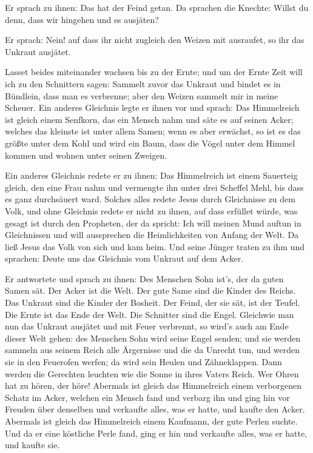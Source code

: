  Er sprach zu ihnen: Das hat der Feind getan. Da sprachen
die Knechte: Willst du denn, dass wir hingehen und es ausjäten?

 Er sprach: Nein! auf dass ihr nicht zugleich den Weizen
mit ausraufet, so ihr das Unkraut ausjätet.

 Lasset beides miteinander wachsen bis zu der Ernte; und
um der Ernte Zeit will ich zu den Schnittern sagen: Sammelt zuvor das
Unkraut und bindet es in Bündlein, dass man es verbrenne; aber den
Weizen sammelt mir in meine Scheuer.  Ein anderes
Gleichnis legte er ihnen vor und sprach: Das Himmelreich ist gleich
einem Senfkorn, das ein Mensch nahm und säte es auf seinen Acker;
 welches das kleinste ist unter allem Samen; wenn es aber
erwächst, so ist es das größte unter dem Kohl und wird ein Baum, dass
die Vögel unter dem Himmel kommen und wohnen unter seinen Zweigen.

 Ein anderes Gleichnis redete er zu ihnen: Das
Himmelreich ist einem Sauerteig gleich, den eine Frau nahm und vermengte
ihn unter drei Scheffel Mehl, bis dass es ganz durchsäuert ward.
 Solches alles redete Jesus durch Gleichnisse zu dem
Volk, und ohne Gleichnis redete er nicht zu ihnen,  auf
dass erfüllet würde, was gesagt ist durch den Propheten, der da spricht:
Ich will meinen Mund auftun in Gleichnissen und will aussprechen die
Heimlichkeiten von Anfang der Welt.  Da ließ Jesus das
Volk von sich und kam heim. Und seine Jünger traten zu ihm und sprachen:
Deute uns das Gleichnis vom Unkraut auf dem Acker.

 Er antwortete und sprach zu ihnen: Des Menschen Sohn
ist's, der da guten Samen sät.  Der Acker ist die Welt.
Der gute Same sind die Kinder des Reichs. Das Unkraut sind die Kinder
der Bosheit.  Der Feind, der sie sät, ist der Teufel. Die
Ernte ist das Ende der Welt. Die Schnitter sind die Engel.
 Gleichwie man nun das Unkraut ausjätet und mit Feuer
verbrennt, so wird's auch am Ende dieser Welt gehen:  des
Menschen Sohn wird seine Engel senden; und sie werden sammeln aus seinem
Reich alle Ärgernisse und die da Unrecht tun,  und werden
sie in den Feuerofen werfen; da wird sein Heulen und Zähneklappen.
 Dann werden die Gerechten leuchten wie die Sonne in
ihres Vaters Reich. Wer Ohren hat zu hören, der höre! 
Abermals ist gleich das Himmelreich einem verborgenen Schatz im Acker,
welchen ein Mensch fand und verbarg ihn und ging hin vor Freuden über
denselben und verkaufte alles, was er hatte, und kaufte den Acker.
 Abermals ist gleich das Himmelreich einem Kaufmann, der
gute Perlen suchte.  Und da er eine köstliche Perle fand,
ging er hin und verkaufte alles, was er hatte, und kaufte sie.

